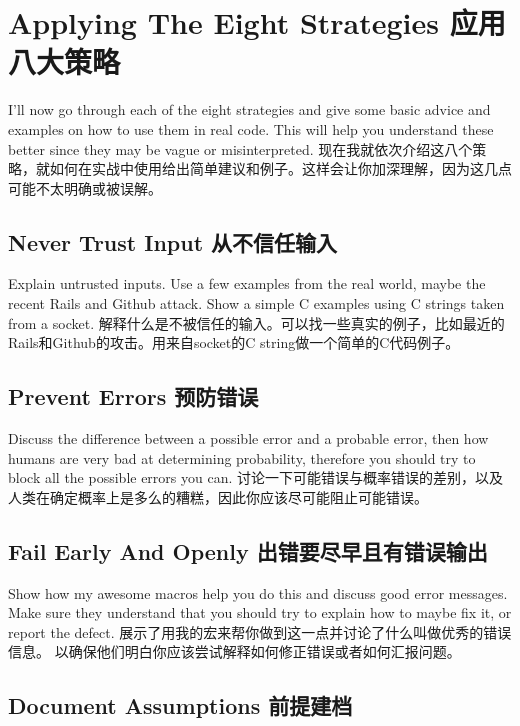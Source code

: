 \section{Applying The Eight Strategies 应用八大策略}

I'll now go through each of the eight strategies and give some basic advice and examples on how to use them in real code.
This will help you understand these better since they may be vague or misinterpreted.
现在我就依次介绍这八个策略，就如何在实战中使用给出简单建议和例子。这样会让你加深理解，因为这几点可能不太明确或被误解。

\subsection{Never Trust Input 从不信任输入}

Explain untrusted inputs. Use a few examples from the real world, maybe the recent Rails and Github attack.
Show a simple C examples using C strings taken from a socket.
解释什么是不被信任的输入。可以找一些真实的例子，比如最近的Rails和Github的攻击。用来自socket的C string做一个简单的C代码例子。

\subsection{Prevent Errors 预防错误}

Discuss the difference between a possible error and a probable error, then how humans are very bad
at determining probability, therefore you should try to block all the possible errors you can.
讨论一下可能错误与概率错误的差别，以及人类在确定概率上是多么的糟糕，因此你应该尽可能阻止可能错误。

\subsection{Fail Early And Openly 出错要尽早且有错误输出}

Show how my awesome macros help you do this and discuss good error messages.  Make sure they understand
that you should try to explain how to maybe fix it, or report the defect.
展示了用我的宏来帮你做到这一点并讨论了什么叫做优秀的错误信息。 以确保他们明白你应该尝试解释如何修正错误或者如何汇报问题。

\subsection{Document Assumptions 前提建档}

